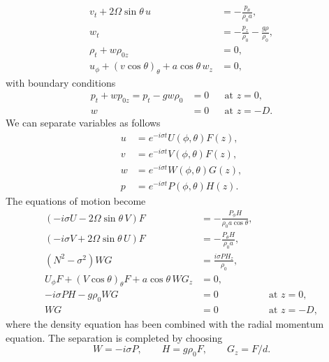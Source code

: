 \begin{align*}
	v_t+2\Omega\sin\theta\,u                     & =-\frac{p_\theta}{\rho_0a},                \\
	w_t                                          & =-\frac{p_z}{\rho_0}-\frac{g\rho}{\rho_0}, \\
	\rho_t+w\rho_{0z}                            & =0,                                        \\
	u_\phi+(v\cos\theta)_\theta+a\cos\theta\,w_z & =0,
\end{align*}
with boundary conditions
\begin{align*}
	p_t+w p_{0z}=p_t-gw\rho_0 & =0 &  & \text{at }z=0,  \\
	w                         & =0 &  & \text{at }z=-D.
\end{align*}
We can separate variables as follows
\begin{align*}
	u & =e^{-i\sigma t}U(\phi,\theta)F(z), \\
	v & =e^{-i\sigma t}V(\phi,\theta)F(z), \\
	w & =e^{-i\sigma t}W(\phi,\theta)G(z), \\
	p & =e^{-i\sigma t}P(\phi,\theta)H(z).
\end{align*}
The equations of motion become
\begin{align*}
	(-i\sigma U-2\Omega\sin\theta\,V)F
	                                                  & =-\frac{P_\phi H}{\rho_0a\cos\theta},                      \\
	(-i\sigma V+2\Omega\sin\theta\,U)F
	                                                  & =-\frac{P_\theta H}{\rho_0a},                              \\
	(N^2-\sigma^2)WG                                  & =\frac{i\sigma P H_z}{\rho_0},                             \\
	U_\phi F+(V\cos\theta)_\theta F+a\cos\theta\,WG_z & =0,                                                        \\
	-i\sigma PH-g\rho_0WG                             & =0                                    &  & \text{at }z=0,  \\
	WG                                                & =0                                    &  & \text{at }z=-D,
\end{align*}
where the density equation has been combined with the radial momentum equation.
The separation is completed by choosing
\[
	W=-i\sigma P,\qquad H=g\rho_0F,\qquad G_z=F/d.
\]

